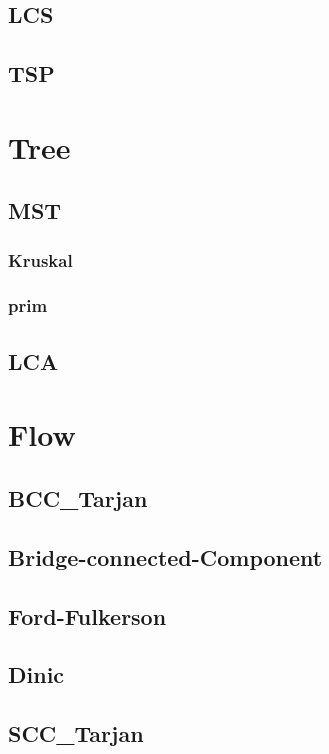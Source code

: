 	\subsection{LCS}
		
	\subsection{TSP}
		
\section{Tree}
	\subsection{MST}
        \subsubsection{Kruskal}
            
        \subsubsection{prim}
            
	\subsection{LCA}
		
\section{Flow}
	\subsection{BCC\_Tarjan}
		
	\subsection{Bridge-connected-Component}
		
	\subsection{Ford-Fulkerson}
		
	\subsection{Dinic}
		
	\subsection{SCC\_Tarjan}
		
